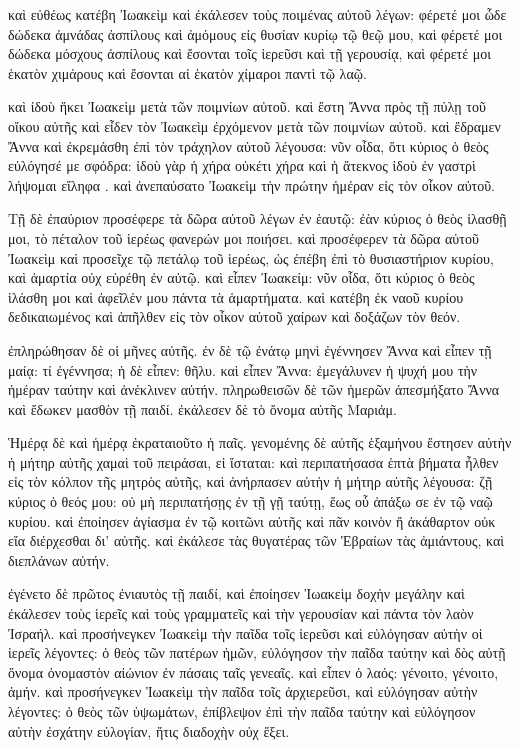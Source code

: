 \pend\pstart
καὶ εὐθέως κατέβη Ἰωακεὶμ καὶ ἐκάλεσεν τοὺς ποιμένας αὐτοῦ λέγων: φέρετέ μοι ὧδε δώδεκα ἀμνάδας ἀσπίλους καὶ ἀμόμους εἰς θυσίαν κυρίῳ τῷ θεῷ μου, καὶ φέρετέ μοι δώδεκα μόσχους ἀσπίλους καὶ ἔσονται τοῖς ἱερεῦσι καὶ τῇ γερουσίᾳ, καὶ φέρετέ μοι ἑκατὸν χιμάρους καὶ ἔσονται αἱ ἑκατὸν χίμαροι παντὶ τῷ λαῷ.

\pend\pstart
καὶ ἰδοὺ ἥκει Ἰωακεὶμ μετὰ τῶν ποιμνίων αὐτοῦ. καὶ ἔστη Ἄννα πρὸς τῇ πύλῃ τοῦ οἴκου αὐτῆς καὶ εἶδεν τὸν Ἰωακεὶμ ἐρχόμενον μετὰ τῶν ποιμνίων αὐτοῦ. καὶ ἔδραμεν Ἄννα καὶ ἐκρεμάσθη ἐπὶ τὸν τράχηλον αὐτοῦ λέγουσα: νῦν οἶδα, ὅτι κύριος ὁ θεὸς εὐλόγησέ με σφόδρα: ἰδοὺ γὰρ ἡ χήρα οὐκέτι χήρα καὶ ἡ ἄτεκνος ἰδοὺ ἐν γαστρὶ λήψομαι εἴληφα . καὶ ἀνεπαύσατο Ἰωακεὶμ τὴν πρώτην ἡμέραν εἰς τὸν οἶκον αὐτοῦ.

\pend\pstart
{}

\pend\setcounter{pstartL}{1}\pstart
Τῇ δὲ ἐπαύριον προσέφερε τὰ δῶρα αὐτοῦ λέγων ἐν ἑαυτῷ: ἐὰν κύριος ὁ θεὸς ἱλασθῇ μοι, τὸ πέταλον τοῦ ἱερέως φανερών μοι ποιήσει. καὶ προσέφερεν τὰ δῶρα αὐτοῦ Ἰωακεὶμ καὶ προσεῖχε τῷ πετάλῳ τοῦ ἱερέως, ὡς ἐπέβη ἐπὶ τὸ θυσιαστήριον κυρίου, καὶ ἁμαρτία οὐχ εὑρέθη ἐν αὐτῷ. καὶ εἶπεν Ἰωακείμ: νῦν οἶδα, ὅτι κύριος ὁ θεὸς ἱλάσθη μοι καὶ ἀφεῖλέν μου πάντα τὰ ἁμαρτήματα. καὶ κατέβη ἐκ ναοῦ κυρίου δεδικαιωμένος καὶ ἀπῆλθεν εἰς τὸν οἶκον αὐτοῦ χαίρων καὶ δοξάζων τὸν θεόν.

\pend\pstart
ἐπληρώθησαν δὲ οἱ μῆνες αὐτῆς. ἐν δὲ τῷ ἐνάτῳ μηνὶ ἐγέννησεν Ἄννα καὶ εἶπεν τῇ μαίᾳ: τί ἐγέννησα; ἡ δὲ εἶπεν: θῆλυ. καὶ εἶπεν Ἄννα: ἐμεγάλυνεν ἡ ψυχή μου τὴν ἡμέραν ταύτην καὶ ἀνέκλινεν αὐτήν. πληρωθεισῶν δὲ τῶν ἡμερῶν ἀπεσμήξατο Ἄννα καὶ ἔδωκεν μασθὸν τῇ παιδί. ἐκάλεσεν δὲ τὸ ὄνομα αὐτῆς Μαριάμ.

\pend\pstart

\pend\setcounter{pstartL}{1}\pstart
Ἡμέρᾳ δὲ καὶ ἡμέρᾳ ἐκραταιοῦτο ἡ παῖς. γενομένης δὲ αὐτῆς ἑξαμήνου ἔστησεν αὐτὴν ἡ μήτηρ αὐτῆς χαμαὶ τοῦ πειράσαι, εἰ ἵσταται: καὶ περιπατήσασα ἑπτὰ βήματα ἦλθεν εἰς τὸν κόλπον τῆς μητρὸς αὐτῆς, καὶ ἀνήρπασεν αὐτὴν ἡ μήτηρ αὐτῆς λέγουσα: ζῇ κύριος ὁ θεός μου: οὐ μὴ περιπατήσῃς ἐν τῇ γῇ ταύτῃ, ἕως οὗ ἀπάξω σε ἐν τῷ ναῷ κυρίου. καὶ ἐποίησεν ἁγίασμα ἐν τῷ κοιτῶνι αὐτῆς καὶ πᾶν κοινὸν ἤ ἀκάθαρτον οὐκ εἴα διέρχεσθαι δι' αὐτῆς. καὶ ἐκάλεσε τὰς θυγατέρας τῶν Ἑβραίων τὰς ἀμιάντους, καὶ διεπλάνων αὐτήν.

\pend\pstart
ἐγένετο δὲ πρῶτος ἐνιαυτὸς τῇ παιδί, καὶ ἐποίησεν Ἰωακεὶμ δοχὴν μεγάλην καὶ ἐκάλεσεν τοὺς ἱερεῖς καὶ τοὺς γραμματεῖς καὶ τὴν γερουσίαν καὶ πάντα τὸν λαὸν Ἰσραήλ. καὶ προσήνεγκεν Ἰωακεὶμ τὴν παῖδα τοῖς ἱερεῦσι καὶ εὐλόγησαν αὐτὴν οἱ ἱερεῖς λέγοντες: ὁ θεὸς τῶν πατέρων ἡμῶν, εὐλόγησον τὴν παῖδα ταύτην καὶ δὸς αὐτῇ ὄνομα ὀνομαστὸν αἰώνιον ἐν πάσαις ταῖς γενεαῖς. καὶ εἶπεν ὁ λαός: γένοιτο, γένοιτο, ἀμήν. καὶ προσήνεγκεν Ἰωακεὶμ τὴν παῖδα τοῖς ἀρχιερεῦσι, καὶ εὐλόγησαν αὐτὴν λέγοντες: ὁ θεὸς τῶν ὑψωμάτων, ἐπίβλεψον ἐπὶ τὴν παῖδα ταύτην καὶ εὐλόγησον αὐτὴν ἐσχάτην εὐλογίαν, ἥτις διαδοχὴν οὐχ ἕξει.


